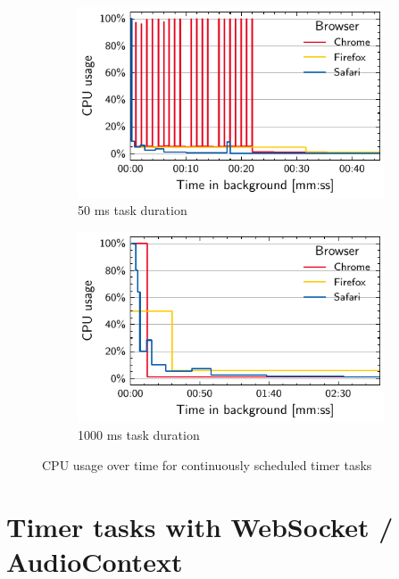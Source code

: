 \documentclass[
	ngerman,
	ruledheaders=section,%
	class=report,%
	thesis={type=bachelor},%
	accentcolor=9c,%
	custommargins=true,%
	marginpar=false,%
	parskip=half-,%
	fontsize=11pt,%
]{tudapub}
\begin{document}
  \begin{figure}
    \begin{subfigure}[t]{0.45\textwidth}
      \includegraphics[width=\textwidth]{images/timer-50.pdf}
      \caption{50 ms task duration}
    \end{subfigure}
    \hfill
    \begin{subfigure}[t]{0.45\textwidth}
      \includegraphics[width=\textwidth]{images/timer-1000.pdf}
      \caption{1000 ms task duration}
    \end{subfigure}

    \caption{CPU usage over time for continuously scheduled timer tasks}
    \label{fig:timer}
  \end{figure}

  \section{Timer tasks with WebSocket / AudioContext}
\end{document}
